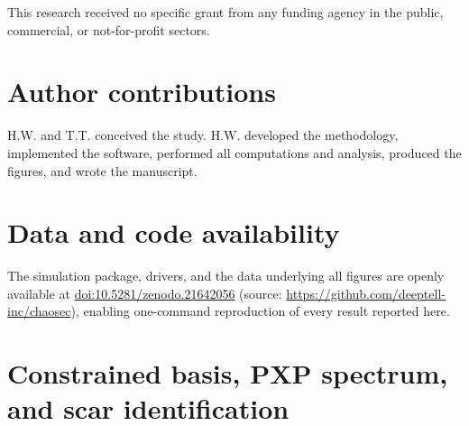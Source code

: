 \documentclass[aps,prb,twocolumn]{revtex4-2}
\begin{document}
\begin{acknowledgments}
This research received no specific grant from any funding
agency in the public, commercial, or not-for-profit sectors.
\end{acknowledgments}

\section*{Author contributions}
H.W. and T.T. conceived the study. H.W. developed the methodology, implemented
the software, performed all computations and analysis, produced the figures,
and wrote the manuscript.

\section*{Data and code availability}
The simulation package, drivers, and the data underlying all figures are openly
available at \href{https://doi.org/10.5281/zenodo.21642056}{doi:10.5281/zenodo.21642056}
(source: \url{https://github.com/deeptell-inc/chaosec}), enabling one-command
reproduction of every result reported here.

\appendix

\section{Constrained basis, PXP spectrum, and scar identification}
\label{app:spectrum}
\end{document}

